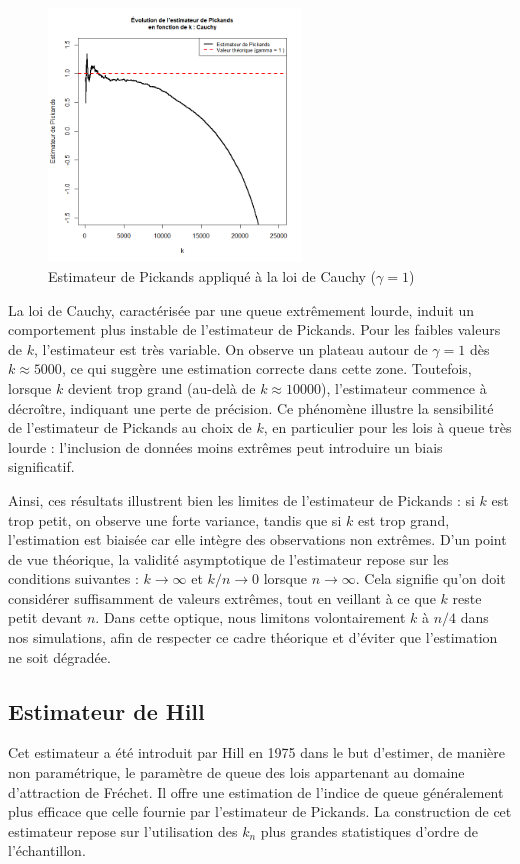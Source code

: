 \documentclass{article}
\theoremstyle{plain}
\theoremstyle{definition}
\theoremstyle{plain}
\begin{document}
\begin{figure}[H]
    \centering
    \includegraphics[width=0.6\textwidth]{./Evolution des estimateurs/pickands/estimateur_pickands_cauchy.png}
    \caption{Estimateur de Pickands appliqué à la loi de Cauchy ($\gamma = 1$)}
\end{figure}
La loi de Cauchy, caractérisée par une queue extrêmement lourde, induit un comportement plus instable de l’estimateur de Pickands. Pour les faibles valeurs de \(k\), l’estimateur est très variable. On observe un plateau autour de \(\gamma = 1\) dès \(k \approx 5000\), ce qui suggère une estimation correcte dans cette zone. Toutefois, lorsque \(k\) devient trop grand (au-delà de \(k \approx 10000\)), l’estimateur commence à décroître, indiquant une perte de précision. Ce phénomène illustre la sensibilité de l’estimateur de Pickands au choix de \(k\), en particulier pour les lois à queue très lourde : l’inclusion de données moins extrêmes peut introduire un biais significatif.

Ainsi, ces résultats illustrent bien les limites de l’estimateur de Pickands : si \(k\) est trop petit, on observe une forte variance, tandis que si \(k\) est trop grand, l’estimation est biaisée car elle intègre des observations non extrêmes. D’un point de vue théorique, la validité asymptotique de l’estimateur repose sur les conditions suivantes : \(k \to \infty\) et \(k/n \to 0\) lorsque \(n \to \infty\). Cela signifie qu’on doit considérer suffisamment de valeurs extrêmes, tout en veillant à ce que \(k\) reste petit devant \(n\). Dans cette optique, nous limitons volontairement \(k\) à \(n/4\) dans nos simulations, afin de respecter ce cadre théorique et d’éviter que l’estimation ne soit dégradée.


\subsection{Estimateur de Hill}
Cet estimateur a été introduit par Hill en 1975 dans le but d’estimer, de manière non paramétrique, le paramètre de queue des lois appartenant au domaine d’attraction de Fréchet. Il offre une estimation de l’indice de queue généralement plus efficace que celle fournie par l’estimateur de Pickands. La construction de cet estimateur repose sur l’utilisation des $k_n$ plus grandes statistiques d’ordre de l’échantillon.
\end{document}
